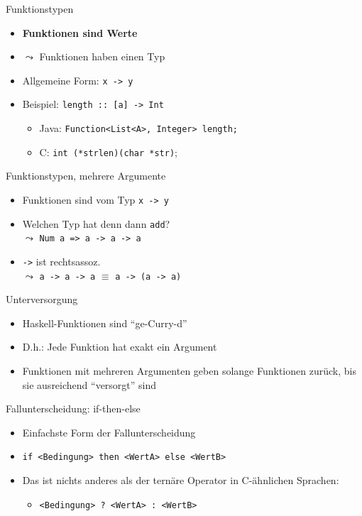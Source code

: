 \documentclass{beamer}
\begin{document}
\begin{frame}{Funktionstypen}
	\begin{itemize}
		\item \textbf{Funktionen sind Werte}
		\item $\leadsto$ Funktionen haben einen Typ
		\item Allgemeine Form: \texttt{x -> y}
		\item Beispiel: \texttt{length :: [a] -> Int}
		\begin{itemize}
			\item Java: \texttt{Function<List<A>, Integer> length;}
			\item C: \texttt{int (*strlen)(char *str)};
		\end{itemize}
	\end{itemize}
\end{frame}

\begin{frame}{Funktionstypen, mehrere Argumente}

	\begin{itemize}
		\item Funktionen sind vom Typ \texttt{x -> y}
		\item Welchen Typ hat denn dann \texttt{add}? \\
		\pause
		$\leadsto$ \texttt{Num a => a -> a -> a}
		\item \texttt{->} ist rechtsassoz. \\
		$\leadsto$ \texttt{a -> a -> a} $\equiv$ \texttt{a -> (a -> a)}
	\end{itemize}
\end{frame}

\begin{frame}{Unterversorgung}
	\begin{itemize}
		\item Haskell-Funktionen sind \enquote{ge-Curry-d}
		\item D.h.: Jede Funktion hat exakt ein Argument
		\item Funktionen mit mehreren Argumenten geben solange Funktionen zurück, bis sie ausreichend \enquote{versorgt} sind
	\end{itemize}

\end{frame}

\begin{frame}{Fallunterscheidung: if-then-else}

	\begin{itemize}
		\item Einfachste Form der Fallunterscheidung
		\item \texttt{if <Bedingung> then <WertA> else <WertB>}
		\pause
		\item Das ist nichts anderes als der ternäre Operator in C-ähnlichen Sprachen:
		\begin{itemize}
			\item \texttt{<Bedingung> ? <WertA> : <WertB>}
		\end{itemize}
	\end{itemize}
\end{frame}
\end{document}
